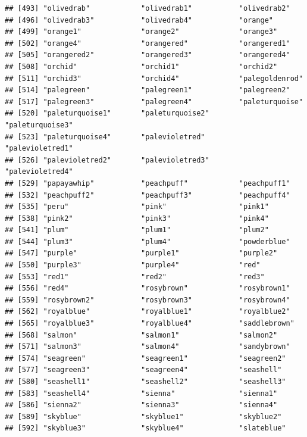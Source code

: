 \documentclass[]{book}
\begin{document}
\begin{verbatim}
## [493] "olivedrab"            "olivedrab1"           "olivedrab2"          
## [496] "olivedrab3"           "olivedrab4"           "orange"              
## [499] "orange1"              "orange2"              "orange3"             
## [502] "orange4"              "orangered"            "orangered1"          
## [505] "orangered2"           "orangered3"           "orangered4"          
## [508] "orchid"               "orchid1"              "orchid2"             
## [511] "orchid3"              "orchid4"              "palegoldenrod"       
## [514] "palegreen"            "palegreen1"           "palegreen2"          
## [517] "palegreen3"           "palegreen4"           "paleturquoise"       
## [520] "paleturquoise1"       "paleturquoise2"       "paleturquoise3"      
## [523] "paleturquoise4"       "palevioletred"        "palevioletred1"      
## [526] "palevioletred2"       "palevioletred3"       "palevioletred4"      
## [529] "papayawhip"           "peachpuff"            "peachpuff1"          
## [532] "peachpuff2"           "peachpuff3"           "peachpuff4"          
## [535] "peru"                 "pink"                 "pink1"               
## [538] "pink2"                "pink3"                "pink4"               
## [541] "plum"                 "plum1"                "plum2"               
## [544] "plum3"                "plum4"                "powderblue"          
## [547] "purple"               "purple1"              "purple2"             
## [550] "purple3"              "purple4"              "red"                 
## [553] "red1"                 "red2"                 "red3"                
## [556] "red4"                 "rosybrown"            "rosybrown1"          
## [559] "rosybrown2"           "rosybrown3"           "rosybrown4"          
## [562] "royalblue"            "royalblue1"           "royalblue2"          
## [565] "royalblue3"           "royalblue4"           "saddlebrown"         
## [568] "salmon"               "salmon1"              "salmon2"             
## [571] "salmon3"              "salmon4"              "sandybrown"          
## [574] "seagreen"             "seagreen1"            "seagreen2"           
## [577] "seagreen3"            "seagreen4"            "seashell"            
## [580] "seashell1"            "seashell2"            "seashell3"           
## [583] "seashell4"            "sienna"               "sienna1"             
## [586] "sienna2"              "sienna3"              "sienna4"             
## [589] "skyblue"              "skyblue1"             "skyblue2"            
## [592] "skyblue3"             "skyblue4"             "slateblue"           

\end{verbatim}
\end{document}
